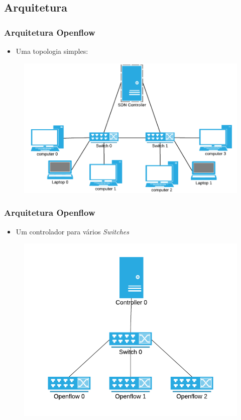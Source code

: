 \subsection{Arquitetura}


%
%
\begin{frame}\frametitle{Arquitetura Openflow}

    \begin{itemize}
    \item Uma topologia simples:
    \end{itemize}
    
	\begin{figure}[h]
        \centering
        \includegraphics[scale=0.3]{images/simple-topology.png}
    \end{figure}
\end{frame}


%
%
\begin{frame}\frametitle{Arquitetura Openflow}

    \begin{itemize}
    \item Um controlador para vários \emph{Switches}
    \end{itemize}
    
	\begin{figure}[h]
        \centering
        \includegraphics[scale=0.4]{images/n-openflow-switches.png}
    \end{figure}
\end{frame}


